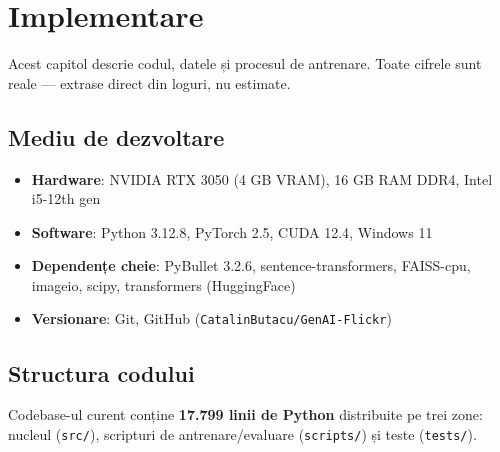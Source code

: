 \chapter{Implementare}
\label{chap:implementare}

Acest capitol descrie codul, datele și procesul de antrenare.  Toate cifrele sunt reale --- extrase direct din loguri, nu estimate.

\section{Mediu de dezvoltare}

\begin{itemize}
    \item \textbf{Hardware}: NVIDIA RTX 3050 (4 GB VRAM), 16 GB RAM DDR4, Intel i5-12th gen
    \item \textbf{Software}: Python 3.12.8, PyTorch 2.5, CUDA 12.4, Windows 11
    \item \textbf{Dependențe cheie}: PyBullet 3.2.6, sentence-transformers, FAISS-cpu, imageio, scipy, transformers (HuggingFace)
    \item \textbf{Versionare}: Git, GitHub (\texttt{CatalinButacu/GenAI-Flickr})
\end{itemize}

\section{Structura codului}

Codebase-ul curent conține \textbf{17.799 linii de Python} distribuite pe trei zone: nucleul (\texttt{src/}), scripturi de antrenare/evaluare (\texttt{scripts/}) și teste (\texttt{tests/}).

